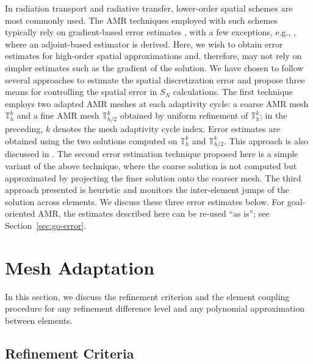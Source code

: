 \documentclass[preprint,10pt]{elsarticle}
\renewcommand{\(}{\left(}
\renewcommand{\)}{\right)}
\renewcommand{\[}{\left[}
\renewcommand{\]}{\right]}
\begin{document}
In radiation transport and radiative transfer, lower-order spatial schemes are most commonly used. The AMR techniques employed with such schemes typically rely on gradient-based error estimates \cite{Jessee1998380}, with a few exceptions, e.g., \cite{kanschat-rad-transfer-97}, where an adjoint-based estimator is derived.
Here, we wish to obtain error estimates for high-order spatial approximations and, therefore, may not rely on simpler estimates such as the gradient of the solution. We have chosen to follow several approaches to estimate the spatial discretization error and propose three means for controlling the spatial error in $S_N$ calculations. The first technique employs two adapted AMR meshes at each adaptivity cycle: a coarse AMR mesh $\mathbb{T}_h^k$ and a fine AMR mesh $\mathbb{T}_{h/2}^k$ obtained by uniform refinement of $\mathbb{T}_h^k$; in the preceding, $k$ denotes the mesh adaptivity cycle index. Error estimates are obtained using the two solutions computed on $\mathbb{T}_{h}^k$ and $\mathbb{T}_{h/2}^k$. This approach is also discussed in \cite{demko-book1,Solin2004449}. The second error estimation technique proposed here is a simple variant of the above technique, where the coarse solution is not computed but approximated by projecting the finer solution onto the coarser mesh. The third approach presented is heuristic and monitors the inter-element jumps of the solution across elements. We discuss these three error estimates below. For goal-oriented AMR, the estimates 
described here can be re-used ``as is''; see Section~\ref{sec:go-error}.





\section{Mesh Adaptation} \label{sec:mesh-adapt}

In this section, we discuss the refinement criterion and the element coupling 
procedure for any refinement difference level and any polynomial approximation
between elements.

\subsection{Refinement Criteria} \label{sec:error4}
\end{document}
